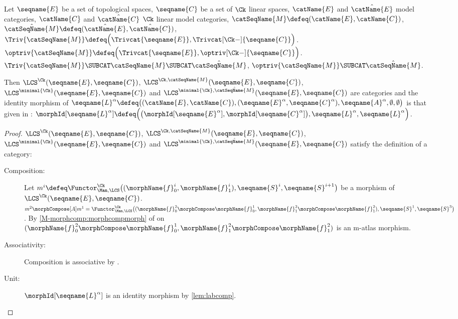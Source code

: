 \documentclass{article}
\begin{document}
\begin{theorem}
\label{the:CktoLCS}
Let $\seqname{E}$ be a set of topological spaces,
$\seqname{C}$ be a set of $\Ck$ linear spaces,
$\catName{E}$ and $\hat{\catName{E}}$ model categories,
$\catName{C}$ and $\hat{\catName{C}}$ $\Ck$ linear model categories,
$\catSeqName{M} \defeq (\catName{E}, \catName{C})$,
$
  \hat{\catSeqName{M}} \defeq
  (\hat{\catName{E}}, \hat{\catName{C}})
$,
$
  \Triv{\catSeqName{M}} \defeq
  \Bigl ( \Trivcat{\seqname{E}}, \Trivcat[\Ck-]{\seqname{C}} \Bigr )
$.
$
  \optriv{\catSeqName{M}} \defeq
  \Bigl ( \Trivcat{\seqname{E}}, \optriv[\Ck-]{\seqname{C}} \Bigr )
$.
$
  \Triv{\catSeqName{M}} \SUBCAT \catSeqName{M}
  \SUBCAT \hat{\catSeqName{M}}
$,
$\optriv{\catSeqName{M}} \SUBCAT \hat{\catSeqName{M}}$.

Then
$\LCS^\Ck(\seqname{E}, \seqname{C})$,
$\LCS^{\Ck,\catSeqName{M}}(\seqname{E}, \seqname{C})$,
$\LCS^{\minimal{\Ck}}(\seqname{E}, \seqname{C})$ and
$\LCS^{\minimal{\Ck},\hat{\catSeqName{M}}}(\seqname{E}, \seqname{C})$
are categories and the identity morphism of
$
   \seqname{L}^\alpha \defeq
    \bigl (
      (\catName{E}, \catName{C}),
      (\seqname{E}^\alpha, \seqname{C}^\alpha),
      \seqname{A}^\alpha,
      \emptyset,
      \emptyset
    \bigr )
$
is that given in :
$
  \morphId[{\seqname{L}^\alpha}]
  \defeq
  \Bigl (
    \bigl ( \morphId[{\seqname{E}^\alpha}], \morphId[{\seqname{C}^\alpha}] \bigr ),
    \seqname{L}^\alpha,
    \seqname{L}^\alpha
  \Bigr )
$.

\begin{proof}
$\LCS^\Ck(\seqname{E}, \seqname{C})$,
$\LCS^{\Ck,\catSeqName{M}}(\seqname{E}, \seqname{C})$,
$\LCS^{\minimal{\Ck}}(\seqname{E}, \seqname{C})$ and
$\LCS^{\minimal{\Ck},\hat{\catSeqName{M}}}(\seqname{E}, \seqname{C})$
satisfy the definition of a category:
\begin{description}
\item[Composition:]
Let
$
  m^i \defeq
  \Functor^{\Ck}_{\Man,\LCS}
    \bigl (
      (
        \morphName{f}^i_0,
        \morphName{f}^i_1
      ),
      \seqname{S}^i,
      \seqname{S}^{i+1}
    \bigr )
$
be a morphism of $\LCS^{\Ck}(\seqname{E}, \seqname{C})$.
$
  m^2 \morphCompose[A] m^1 =
  \Functor^{\Ck}_{\Man,\LCS}
    \bigl (
      (
        \morphName{f}^2_0 \morphCompose \morphName{f}^1_0,
        \morphName{f}^2_1 \morphCompose \morphName{f}^2_1
      ),
      \seqname{S}^1,
      \seqname{S}^3
    \bigr )
$.
By
\cref{M-morphcomp:morphcompmorph} of
{
  \showlabelsinline
   on
}
$
  (
    \morphName{f}^2_0 \morphCompose \morphName{f}^1_0,
    \morphName{f}^2_1 \morphCompose \morphName{f}^2_1
  )
$
is an m-atlas morphism.
\item[Associativity:]
Composition is associative by .
\item[Unit:]
$\morphId[{\seqname{L}^\alpha}]$ is an identity morphism by
\cref{lem:labcomp}.
\end{description}


\end{proof}
\end{theorem}
\end{document}
